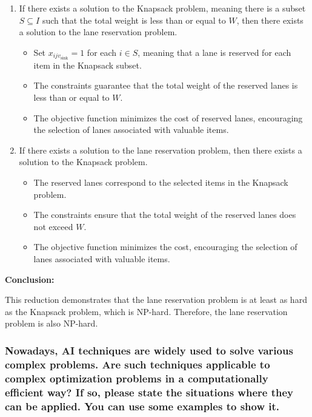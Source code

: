 \documentclass{article}
\begin{document}
\begin{enumerate}
  \item If there exists a solution to the Knapsack problem, meaning there is a subset \(S \subseteq I\) such that the total weight is less than or equal to \(W\), then there exists a solution to the lane reservation problem.
  \begin{itemize}
    \item Set \(x_{ijv_{\text{sink}}} = 1\) for each \(i \in S\), meaning that a lane is reserved for each item in the Knapsack subset.
    
    \item The constraints guarantee that the total weight of the reserved lanes is less than or equal to \(W\).
    
    \item The objective function minimizes the cost of reserved lanes, encouraging the selection of lanes associated with valuable items.
  \end{itemize}
  \item If there exists a solution to the lane reservation problem, then there exists a solution to the Knapsack problem.
  \begin{itemize}
    \item The reserved lanes correspond to the selected items in the Knapsack problem.
    
    \item The constraints ensure that the total weight of the reserved lanes does not exceed \(W\).
    
    \item The objective function minimizes the cost, encouraging the selection of lanes associated with valuable items.
  \end{itemize}
\end{enumerate}


\textbf{Conclusion:}

This reduction demonstrates that the lane reservation problem is at least as hard as the Knapsack problem, which is NP-hard. Therefore, the lane reservation problem is also NP-hard.

\subsubsection{Nowadays, AI techniques are widely used to solve various complex problems. Are such techniques applicable to complex optimization problems in a computationally efficient way? If so, please state the situations where they can be applied. You can use some examples to show it.}
\end{document}
